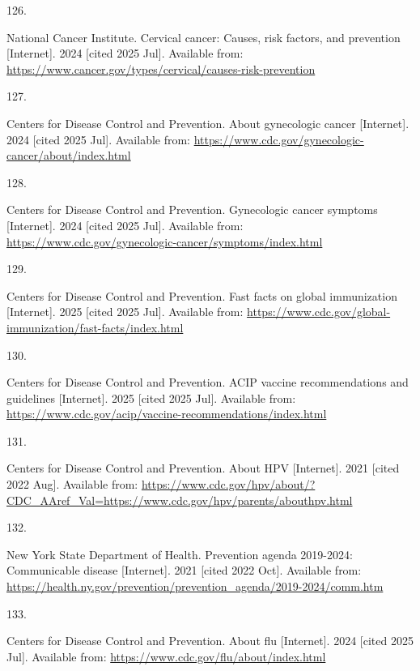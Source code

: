 \documentclass[
  english,
  letterpaper,
]{report}
\newlength{\cslhangindent}
\newlength{\csllabelwidth}
\newenvironment{CSLReferences}[2] %
 {\begin{list}{}{%
  \setlength{\itemindent}{0pt}
  \setlength{\leftmargin}{0pt}
  \setlength{\parsep}{0pt}
  \ifodd #1
   \setlength{\leftmargin}{\cslhangindent}
   \setlength{\itemindent}{-1\cslhangindent}
  \fi
  \setlength{\itemsep}{#2\baselineskip}}}
 {\end{list}}
\newcommand{\CSLLeftMargin}[1]{\parbox[t]{\csllabelwidth}{\strut#1\strut}}
\newcommand{\CSLRightInline}[1]{\parbox[t]{\linewidth - \csllabelwidth}{\strut#1\strut}}
\begin{document}
\begin{CSLReferences}{0}{1}
\CSLLeftMargin{126. }%
\CSLRightInline{National Cancer Institute. Cervical cancer: Causes, risk
factors, and prevention {[}Internet{]}. 2024 {[}cited 2025 Jul{]}.
Available from:
\url{https://www.cancer.gov/types/cervical/causes-risk-prevention}}

\CSLLeftMargin{127. }%
\CSLRightInline{Centers for Disease Control and Prevention. About
gynecologic cancer {[}Internet{]}. 2024 {[}cited 2025 Jul{]}. Available
from: \url{https://www.cdc.gov/gynecologic-cancer/about/index.html}}

\CSLLeftMargin{128. }%
\CSLRightInline{Centers for Disease Control and Prevention. Gynecologic
cancer symptoms {[}Internet{]}. 2024 {[}cited 2025 Jul{]}. Available
from: \url{https://www.cdc.gov/gynecologic-cancer/symptoms/index.html}}

\CSLLeftMargin{129. }%
\CSLRightInline{Centers for Disease Control and Prevention. Fast facts
on global immunization {[}Internet{]}. 2025 {[}cited 2025 Jul{]}.
Available from:
\url{https://www.cdc.gov/global-immunization/fast-facts/index.html}}

\CSLLeftMargin{130. }%
\CSLRightInline{Centers for Disease Control and Prevention. ACIP vaccine
recommendations and guidelines {[}Internet{]}. 2025 {[}cited 2025
Jul{]}. Available from:
\url{https://www.cdc.gov/acip/vaccine-recommendations/index.html}}

\CSLLeftMargin{131. }%
\CSLRightInline{Centers for Disease Control and Prevention. About HPV
{[}Internet{]}. 2021 {[}cited 2022 Aug{]}. Available from:
\url{https://www.cdc.gov/hpv/about/?CDC_AAref_Val=https://www.cdc.gov/hpv/parents/abouthpv.html}}

\CSLLeftMargin{132. }%
\CSLRightInline{New York State Department of Health. Prevention agenda
2019-2024: Communicable disease {[}Internet{]}. 2021 {[}cited 2022
Oct{]}. Available from:
\url{https://health.ny.gov/prevention/prevention_agenda/2019-2024/comm.htm}}

\CSLLeftMargin{133. }%
\CSLRightInline{Centers for Disease Control and Prevention. About flu
{[}Internet{]}. 2024 {[}cited 2025 Jul{]}. Available from:
\url{https://www.cdc.gov/flu/about/index.html}}


\end{CSLReferences}
\end{document}
